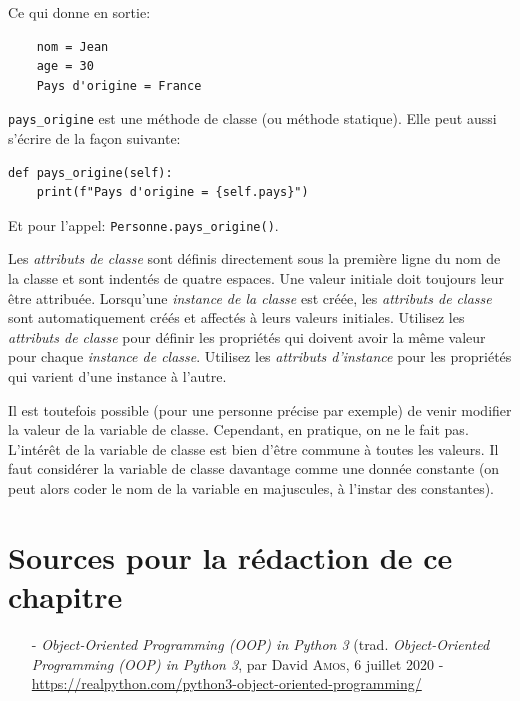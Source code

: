 \documentclass[a4paper,11pt]{book}
\begin{document}
Ce qui donne en sortie:
\begin{verbatim}
    nom = Jean
    age = 30
    Pays d'origine = France
\end{verbatim}
\medskip

\texttt{pays\_origine} est une méthode de classe (ou méthode statique). Elle peut aussi s'écrire de la façon suivante:
\begin{lstlisting}
def pays_origine(self):
    print(f"Pays d'origine = {self.pays}")
\end{lstlisting}
\medskip

Et pour l'appel: \texttt{Personne.pays\_origine()}.
\medskip

Les \textit{attributs de classe} sont définis directement sous la première ligne du nom de la classe et sont indentés de quatre espaces. Une valeur initiale doit toujours leur être attribuée. Lorsqu'une \textit{instance de la classe} est créée, les \textit{attributs de classe} sont automatiquement créés et affectés à leurs valeurs initiales. Utilisez les \textit{attributs de classe} pour définir les propriétés qui doivent avoir la même valeur pour chaque \textit{instance de classe}. Utilisez les \textit{attributs d'instance} pour les propriétés qui varient d'une instance à l'autre.
\medskip

Il est toutefois possible (pour une personne précise par exemple) de venir modifier la valeur de la variable de classe. Cependant, en pratique, on ne le fait pas. L'intérêt de la variable de classe est bien d'être commune à toutes les valeurs. Il faut considérer la variable de classe davantage comme une donnée constante (on peut alors coder le nom de la variable en majuscules, à l'instar des constantes).
\medskip

\section*{Sources pour la rédaction de ce chapitre}
\begin{itemize}
	\item[-] \textit{Object-Oriented Programming (OOP) in Python 3} (trad. \textit{Object-Oriented Programming (OOP) in Python 3}, par David \textsc{Amos}, 6 juillet 2020 - \\ \url{https://realpython.com/python3-object-oriented-programming/}
\end{itemize}
\medskip
\end{document}
